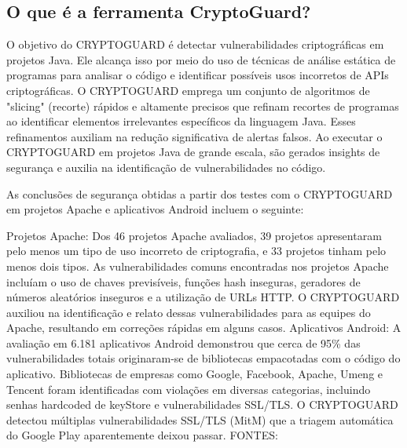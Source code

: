 \subsection{O que é a ferramenta CryptoGuard?}

O objetivo do CRYPTOGUARD é detectar vulnerabilidades criptográficas em projetos Java. Ele alcança isso por meio do uso de técnicas de análise estática de programas para analisar o código e identificar possíveis usos incorretos de APIs criptográficas. O CRYPTOGUARD emprega um conjunto de algoritmos de "slicing" (recorte) rápidos e altamente precisos que refinam recortes de programas ao identificar elementos irrelevantes específicos da linguagem Java. Esses refinamentos auxiliam na redução significativa de alertas falsos. Ao executar o CRYPTOGUARD em projetos Java de grande escala, são gerados insights de segurança e auxilia na identificação de vulnerabilidades no código.



As conclusões de segurança obtidas a partir dos testes com o CRYPTOGUARD em projetos Apache e aplicativos Android incluem o seguinte:

Projetos Apache:
Dos 46 projetos Apache avaliados, 39 projetos apresentaram pelo menos um tipo de uso incorreto de criptografia, e 33 projetos tinham pelo menos dois tipos.
As vulnerabilidades comuns encontradas nos projetos Apache incluíam o uso de chaves previsíveis, funções hash inseguras, geradores de números aleatórios inseguros e a utilização de URLs HTTP.
O CRYPTOGUARD auxiliou na identificação e relato dessas vulnerabilidades para as equipes do Apache, resultando em correções rápidas em alguns casos.
Aplicativos Android:
A avaliação em 6.181 aplicativos Android demonstrou que cerca de 95\% das vulnerabilidades totais originaram-se de bibliotecas empacotadas com o código do aplicativo.
Bibliotecas de empresas como Google, Facebook, Apache, Umeng e Tencent foram identificadas com violações em diversas categorias, incluindo senhas hardcoded de keyStore e vulnerabilidades SSL/TLS.
O CRYPTOGUARD detectou múltiplas vulnerabilidades SSL/TLS (MitM) que a triagem automática do Google Play aparentemente deixou passar.
FONTES:


